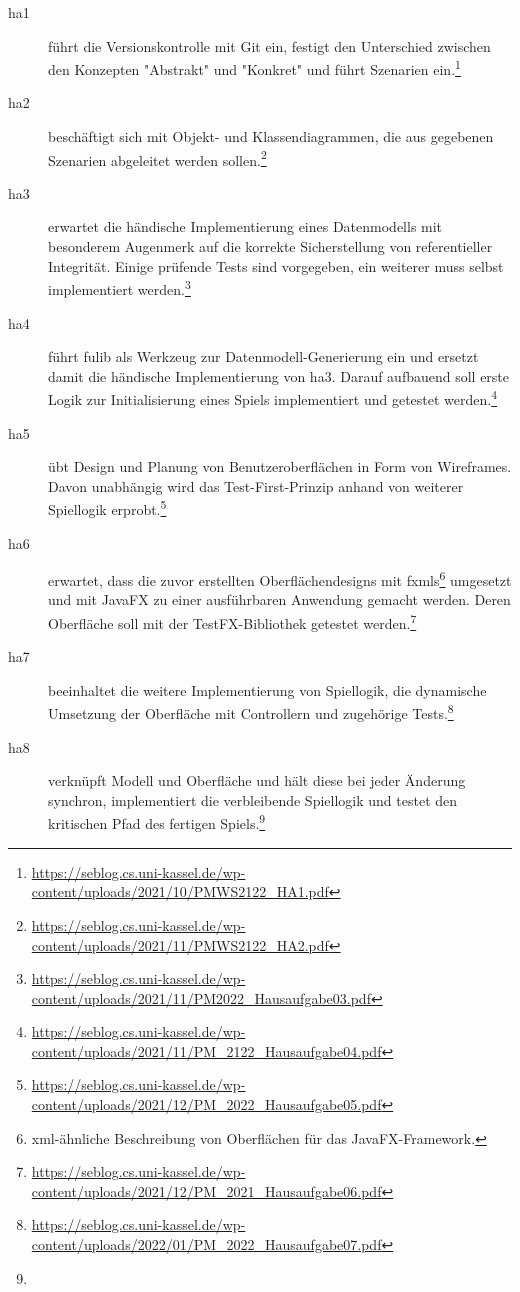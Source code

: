 \begin{description}
    \item[\ac{ha}1] führt die Versionskontrolle mit Git ein, festigt den Unterschied zwischen den Konzepten "Abstrakt" und "Konkret" und führt Szenarien ein.\footnote{
        \url{https://seblog.cs.uni-kassel.de/wp-content/uploads/2021/10/PMWS2122_HA1.pdf}
    }
    \item[\ac{ha}2] beschäftigt sich mit Objekt- und Klassendiagrammen, die aus gegebenen Szenarien abgeleitet werden sollen.\footnote{
        \url{https://seblog.cs.uni-kassel.de/wp-content/uploads/2021/11/PMWS2122_HA2.pdf}
    }
    \item[\ac{ha}3] erwartet die händische Implementierung eines Datenmodells mit besonderem Augenmerk auf die korrekte Sicherstellung von referentieller Integrität.
    Einige prüfende Tests sind vorgegeben, ein weiterer muss selbst implementiert werden.\footnote{
        \url{https://seblog.cs.uni-kassel.de/wp-content/uploads/2021/11/PM2022_Hausaufgabe03.pdf}
    }
    \item[\ac{ha}4] führt fulib als Werkzeug zur Datenmodell-Generierung ein und ersetzt damit die händische Implementierung von \ac{ha}3.
    Darauf aufbauend soll erste Logik zur Initialisierung eines Spiels implementiert und getestet werden.\footnote{
        \url{https://seblog.cs.uni-kassel.de/wp-content/uploads/2021/11/PM_2122_Hausaufgabe04.pdf}
    }
    \item[\ac{ha}5] übt Design und Planung von Benutzeroberflächen in Form von Wireframes.
    Davon unabhängig wird das Test-First-Prinzip anhand von weiterer Spiellogik erprobt.\footnote{
        \url{https://seblog.cs.uni-kassel.de/wp-content/uploads/2021/12/PM_2022_Hausaufgabe05.pdf}
    }
    \item[\ac{ha}6] erwartet, dass die zuvor erstellten Oberflächendesigns mit \acp{fxml}\footnote{
        \ac{xml}-ähnliche Beschreibung von Oberflächen für das JavaFX-Framework.
    } umgesetzt und mit JavaFX zu einer ausführbaren Anwendung gemacht werden.
    Deren Oberfläche soll mit der TestFX-Bibliothek getestet werden.\footnote{
        \url{https://seblog.cs.uni-kassel.de/wp-content/uploads/2021/12/PM_2021_Hausaufgabe06.pdf}
    }
    \item[\ac{ha}7] beeinhaltet die weitere Implementierung von Spiellogik, die dynamische Umsetzung der Oberfläche mit Controllern und zugehörige Tests.\footnote{
        \url{https://seblog.cs.uni-kassel.de/wp-content/uploads/2022/01/PM_2022_Hausaufgabe07.pdf}
    }
    \item[\ac{ha}8] verknüpft Modell und Oberfläche und hält diese bei jeder Änderung synchron, implementiert die verbleibende Spiellogik und testet den kritischen Pfad des fertigen Spiels.\footnote{
}
\end{description}
